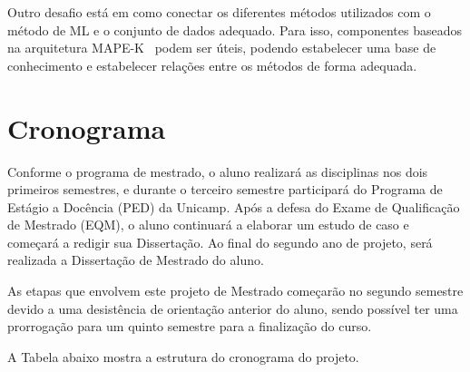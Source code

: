 \documentclass[portugues, 12pt, a4paper]{article}
\begin{document}
Outro desafio está em como conectar os diferentes métodos utilizados com o método de ML e o conjunto de dados adequado. Para isso, componentes baseados na arquitetura MAPE-K~\citep{IBM_2005} podem ser úteis, podendo estabelecer uma base de conhecimento e estabelecer relações entre os métodos de forma adequada.

\section{Cronograma}

Conforme o programa de mestrado, o aluno realizará as disciplinas nos dois primeiros semestres, e durante o terceiro semestre participará do Programa de Estágio a Docência (PED) da Unicamp. Após a defesa do Exame de Qualificação de Mestrado (EQM), o aluno continuará a elaborar um estudo de caso e começará a redigir sua Dissertação. Ao final do segundo ano de projeto, será realizada a Dissertação de Mestrado do aluno.

As etapas que envolvem este projeto de Mestrado começarão no segundo semestre devido a uma desistência de orientação anterior do aluno, sendo possível ter uma prorrogação para um quinto semestre para a finalização do curso.

A Tabela abaixo mostra a estrutura do cronograma do projeto.
\end{document}
